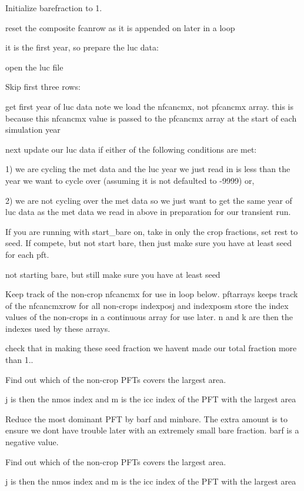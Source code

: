  Initialize barefraction to 1.

reset the composite fcanrow as it is appended on later in a loop

it is the first year, so prepare the luc data\+:

open the luc file

Skip first three rows\+:

get first year of luc data note we load the nfcancmx, not pfcancmx array. this is because this nfcancmx value is passed to the pfcancmx array at the start of each simulation year

next update our luc data if either of the following conditions are met\+:

1) we are cycling the met data and the luc year we just read in is less than the year we want to cycle over (assuming it is not defaulted to -\/9999) or,

2) we are not cycling over the met data so we just want to get the same year of luc data as the met data we read in above in preparation for our transient run.

If you are running with start\+\_\+bare on, take in only the crop fractions, set rest to seed. If compete, but not start bare, then just make sure you have at least seed for each pft.

not starting bare, but still make sure you have at least seed

Keep track of the non-\/crop nfcancmx for use in loop below. pftarrays keeps track of the nfcancmxrow for all non-\/crops indexposj and indexposm store the index values of the non-\/crops in a continuous array for use later. n and k are then the indexes used by these arrays.

check that in making these seed fraction we haven\textquotesingle{}t made our total fraction more than 1..

Find out which of the non-\/crop P\+F\+Ts covers the largest area.

j is then the nmos index and m is the icc index of the P\+F\+T with the largest area

Reduce the most dominant P\+F\+T by barf and minbare. The extra amount is to ensure we don\textquotesingle{}t have trouble later with an extremely small bare fraction. barf is a negative value.

Find out which of the non-\/crop P\+F\+Ts covers the largest area.

j is then the nmos index and m is the icc index of the P\+F\+T with the largest area

